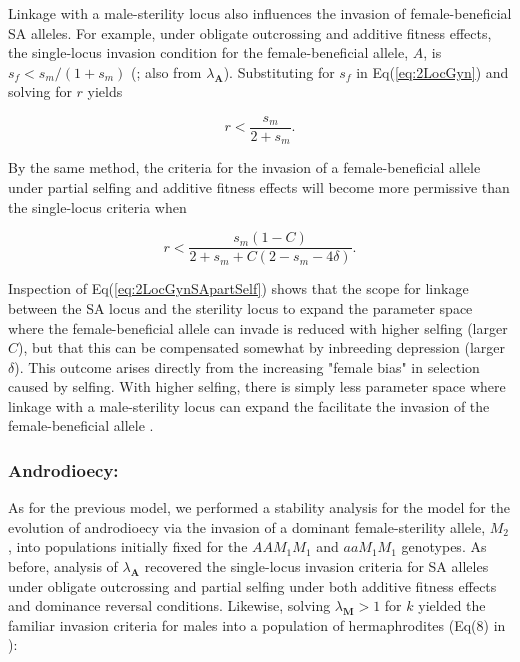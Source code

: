 \documentclass[9pt,twocolumn,twoside,lineno]{gsajnl}
\begin{document}
Linkage with a male-sterility locus also influences the invasion of female-beneficial SA alleles. For example, under obligate outcrossing and additive fitness effects, the single-locus invasion condition for the female-beneficial allele, $A$, is $s_f < s_m / (1+s_m)$ (\citealt{Kidwell1977}; also from $\lambda_{\mathbf{A}}$). Substituting for $s_f$ in Eq(\ref{eq:2LocGyn}) and solving for $r$ yields

\begin{equation}\label{eq:2LocGynSA}
	r < \frac{s_m}{2 + s_m}.
\end{equation}

\noindent By the same method, the criteria for the invasion of a female-beneficial allele under partial selfing and additive fitness effects will become more permissive than the single-locus criteria when 

\begin{equation}\label{eq:2LocGynSApartSelf}
	r < \frac{s_m (1 - C)}{2 + s_m +C (2 - s_m - 4 \delta)}.
\end{equation}

\noindent Inspection of Eq(\ref{eq:2LocGynSApartSelf}) shows that the scope for linkage between the SA locus and the sterility locus to expand the parameter space where the female-beneficial allele can invade is reduced with higher selfing (larger $C$), but that this can be compensated somewhat by inbreeding depression (larger $\delta$). This outcome arises directly from the increasing "female bias" in selection caused by selfing. With higher selfing, there is simply less parameter space where linkage with a male-sterility locus can expand the facilitate the invasion of the female-beneficial allele \citep{JordanConnallon2014,Olito2017}.

\subsubsection{Androdioecy:} As for the previous model, we performed a stability analysis for the model for the evolution of androdioecy via the invasion of a dominant female-sterility allele, $M_2$, into populations initially fixed for the $AAM_1M_1$ and $aaM_1M_1$ genotypes. As before, analysis of $\lambda_{\mathbf{A}}$ recovered the single-locus invasion criteria for SA alleles under obligate outcrossing and partial selfing under both additive fitness effects and dominance reversal conditions. Likewise, solving $\lambda_{\mathbf{M}} > 1$ for $k$ yielded the familiar invasion criteria for males into a population of hermaphrodites (Eq(8) in \citealt{Charlesworth1978a}):
\end{document}

